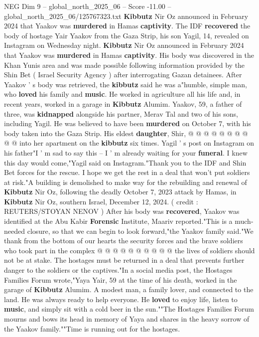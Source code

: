 \begin{textsample}{NEG Dim 9 – global\_north\_2025\_06 – Score -11.00 – global\_north\_2025\_06/125767323.txt}  \label{ex:f9_neg_091}
\textbf{Kibbutz} Nir Oz announced in February 2024 that Yaakov was \textbf{murdered} in Hamas \textbf{captivity}.
The IDF \textbf{recovered} the body of hostage Yair Yaakov from the Gaza Strip, his son Yagil, 14, revealed on Instagram on Wednesday night. \textbf{Kibbutz} Nir Oz announced in February 2024 that Yaakov was \textbf{murdered} in Hamas \textbf{captivity}.
His body was discovered in the Khan Yunis area and was made possible following information provided by the Shin Bet ( Israel Security Agency ) after interrogating Gazan detainees.
After Yaakov ' s body was retrieved, the \textbf{kibbutz} said he was a"humble, simple man, who \textbf{loved} his family and \textbf{music}.
He worked in agriculture all his life and, in recent years, worked in a garage in \textbf{Kibbutz} Alumim.
Yaakov, 59, a father of three, was \textbf{kidnapped} alongside his partner, Merav Tal and two of his sons, including Yagil.
He was believed to have been \textbf{murdered} on October 7, with his body taken into the Gaza Strip.
His eldest \textbf{daughter}, Shir, @ @ @ @ @ @ @ @ @ @ into her apartment on the \textbf{kibbutz} six times.
Yagil ' s post on Instagram on his father"I ' m sad to say this -- I ' m already waiting for your \textbf{funeral}.
I knew this day would come,"Yagil said on Instagram."Thank you to the IDF and Shin Bet forces for the rescue.
I hope we get the rest in a deal that won't put soldiers at risk."A building is demolished to make way for the rebuilding and renewal of \textbf{Kibbutz} Nir Oz, following the deadly October 7, 2023 attack by Hamas, in \textbf{Kibbutz} Nir Oz, southern Israel, December 12, 2024. ( credit : REUTERS/STOYAN NENOV ) After his body was \textbf{recovered}, Yaakov was identified at the Abu Kabir \textbf{Forensic} Institute, Maariv reported."This is a much-needed closure, so that we can begin to look forward,"the Yaakov family said."We thank from the bottom of our hearts the security forces and the brave soldiers who took part in the complex @ @ @ @ @ @ @ @ @ @ the lives of soldiers should not be at stake.
The hostages must be returned in a deal that prevents further danger to the soldiers or the captives."In a social media post, the Hostages Families Forum wrote,"Yaya Yair, 59 at the time of his death, worked in the garage of \textbf{Kibbutz} Alumim.
A modest man, a family lover, and connected to the land.
He was always ready to help everyone.
He \textbf{loved} to enjoy life, listen to \textbf{music}, and simply sit with a cold beer in the sun.""The Hostages Families Forum mourns and bows its head in memory of Yaya and shares in the heavy sorrow of the Yaakov family.""Time is running out for the hostages.

\end{textsample}
